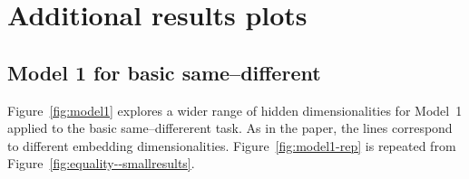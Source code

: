 \documentclass{article}
\newcommand{\Figref}[1]{Figure~\ref{#1}}
\newcommand{\figref}[1]{Figure~\ref{#1}}
\begin{document}
\newpage


\section{Additional results plots}


\subsection{Model 1 for basic same--different}\label{app:model1-results}

\Figref{fig:model1} explores a wider range of hidden dimensionalities for Model~1 applied to the basic same--differerent task. As in the paper, the lines correspond to different embedding dimensionalities. \Figref{fig:model1-rep} is repeated from \figref{fig:equality--smallresults}.
\end{document}

